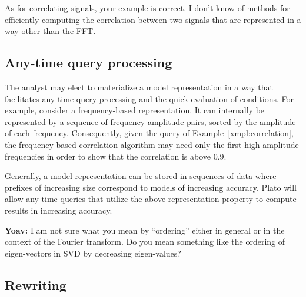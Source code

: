 As for correlating signals, your example is correct. I don't know of
methods for efficiently computing the correlation between two signals 
that are represented in a way other than the FFT.

\subsection{Any-time query processing}
\label{sec:anytime}
The analyst may elect to materialize a model representation in a way that facilitates any-time query processing and the quick evaluation of conditions. For example, consider a frequency-based representation. It can internally be represented by a sequence of frequency-amplitude pairs, sorted by the amplitude of each frequency. Consequently, given the query of Example~\ref{xmpl:correlation}, the frequency-based correlation algorithm may need only the first high amplitude frequencies in order to show that the correlation is above 0.9. 

Generally, a model representation can be stored in sequences of data where prefixes of increasing size correspond to models of increasing accuracy. Plato will allow any-time queries that utilize the above representation property to compute results in increasing accuracy.


{\bf Yoav:} I am not sure what you mean by ``ordering'' either in
general or in the context of the Fourier transform. Do you mean
something like the ordering of eigen-vectors in SVD by decreasing eigen-values?


\subsection{Rewriting}
